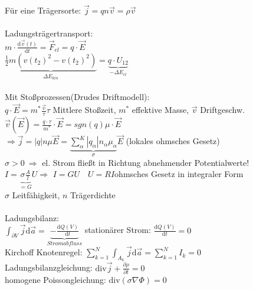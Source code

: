 \documentclass[10pt,a4paper]{scrartcl}
\begin{document}
Für eine Trägersorte: $\vec j = q n \vec v=\rho \vec v$\\
\\
Ladungsträgertransport:\\
$m\cdot \frac{\mathrm d \vec v(t)}{\mathrm d t}=\vec F_{el}=q\cdot \vec E$\\
$\underbrace{\frac 12 m \left(v(t_2)^2-v(t_2)^2\right)}_{\Delta E_{kin}}=\underbrace{q\cdot U_{12}}_{-\Delta E_{el}}$\\
\\
Mit Stoßprozessen(Drudes Driftmodell):\\
$q\cdot \vec E=m^* \frac{ \vec v}{\tau}$\qquad $\tau$ Mittlere Stoßzeit, $m^*$ effektive Masse, $\vec v$ Driftgeschw.\\
$\vec v(\vec E)=\frac{q\cdot \tau}{m^{*}}\cdot \vec E=sgn(q)\mu\cdot \vec E$\\
$\Rightarrow \vec j = |q| n \mu \vec E=\underbrace{\sum_\alpha ^K |q_\alpha| n_\alpha \mu_\alpha}_{\sigma} \vec E$ (lokales ohmsches Gesetz)\\
$\sigma > 0 \ \Rightarrow$ el. Strom fließt in Richtung abnehmender Potentialwerte!\\
$I=\underbrace{\sigma \frac{A}{l}}_{=G} U$\qquad $\Rightarrow$ \qquad $I=GU \quad U=RI$\quad ohmsches Gesetz in integraler Form\\
$\sigma$ Leitfähigkeit, $n$ Trägerdichte\\
\\
Ladungsbilanz:\\
$\int_{\partial V} \vec j \mathrm d \vec a = \underbrace{- \frac{\mathrm d Q(V)}{\mathrm d t}}_{Stromabfluss}$ \quad stationärer Strom: $\frac{\mathrm d Q(V)}{\mathrm d t}=0$\\
Kirchoff Knotenregel: $\sum_{k=1}^N \int_{A_k}\vec j \mathrm d \vec a = \sum_{k=1}^N I_k = 0$\\
Ladungsbilanzgleichung: $\mathrm{div} \vec j + \frac{\partial\rho }{\partial t} = 0$\\	
homogene Poissongleichung: $\mathrm{div}(\sigma \nabla \Phi) = 0$\\
\end{document}
